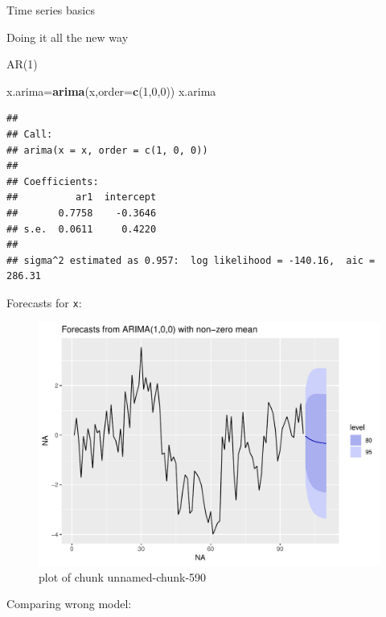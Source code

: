 \documentclass[ignorenonframetext,]{beamer}
\newenvironment{Shaded}{\begin{snugshade}}{\end{snugshade}}
\newcommand{\DataTypeTok}[1]{\textcolor[rgb]{0.13,0.29,0.53}{#1}}
\newcommand{\DecValTok}[1]{\textcolor[rgb]{0.00,0.00,0.81}{#1}}
\newcommand{\KeywordTok}[1]{\textcolor[rgb]{0.13,0.29,0.53}{\textbf{#1}}}
\newcommand{\NormalTok}[1]{#1}
\newcommand{\OperatorTok}[1]{\textcolor[rgb]{0.81,0.36,0.00}{\textbf{#1}}}
\newcommand{\StringTok}[1]{\textcolor[rgb]{0.31,0.60,0.02}{#1}}
\begin{document}
\begin{frame}[fragile]{Time series basics}
\begin{block}{Doing it all the new way}
\begin{block}{AR(1)}
\begin{Shaded}
\begin{Highlighting}[]
\NormalTok{x.arima=}\KeywordTok{arima}\NormalTok{(x,}\DataTypeTok{order=}\KeywordTok{c}\NormalTok{(}\DecValTok{1}\NormalTok{,}\DecValTok{0}\NormalTok{,}\DecValTok{0}\NormalTok{))}
\NormalTok{x.arima}
\end{Highlighting}
\end{Shaded}

\begin{verbatim}
## 
## Call:
## arima(x = x, order = c(1, 0, 0))
## 
## Coefficients:
##          ar1  intercept
##       0.7758    -0.3646
## s.e.  0.0611     0.4220
## 
## sigma^2 estimated as 0.957:  log likelihood = -140.16,  aic = 286.31
\end{verbatim}

Forecasts for \texttt{x}:

\begin{Shaded}
\end{Shaded}

\begin{figure}
\centering
\includegraphics{figure/unnamed-chunk-590-1.pdf}
\caption{plot of chunk unnamed-chunk-590}
\end{figure}

Comparing wrong model:

\begin{Shaded}
\end{Shaded}


\end{block}
\end{block}
\end{frame}
\end{document}
